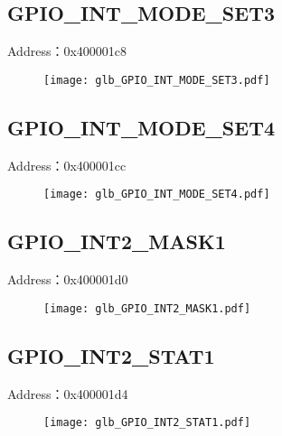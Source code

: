 \subsection{GPIO\_INT\_MODE\_SET3}
\label{glb-GPIO-INT-MODE-SET3}
Address：0x400001c8
 \begin{figure}[H]
\texttt{[image: glb\_GPIO\_INT\_MODE\_SET3.pdf]}
\end{figure}

\subsection{GPIO\_INT\_MODE\_SET4}
\label{glb-GPIO-INT-MODE-SET4}
Address：0x400001cc
 \begin{figure}[H]
\texttt{[image: glb\_GPIO\_INT\_MODE\_SET4.pdf]}
\end{figure}

\subsection{GPIO\_INT2\_MASK1}
\label{glb-GPIO-INT2-MASK1}
Address：0x400001d0
 \begin{figure}[H]
\texttt{[image: glb\_GPIO\_INT2\_MASK1.pdf]}
\end{figure}

\subsection{GPIO\_INT2\_STAT1}
\label{glb-GPIO-INT2-STAT1}
Address：0x400001d4
 \begin{figure}[H]
\texttt{[image: glb\_GPIO\_INT2\_STAT1.pdf]}
\end{figure}

